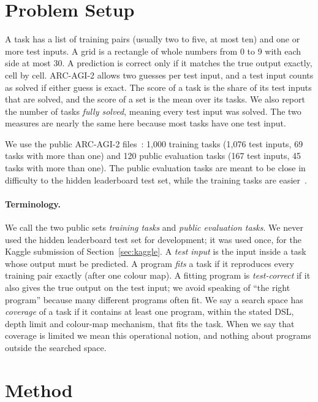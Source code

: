 \documentclass[sigconf,nonacm]{acmart}
\begin{document}
\section{Problem Setup}

A task has a list of training pairs (usually two to five, at most ten) and one or more test inputs. A grid is a rectangle of whole numbers from 0 to 9 with each side at most 30. A prediction is correct only if it matches the true output exactly, cell by cell. ARC-AGI-2 allows two guesses per test input, and a test input counts as solved if either guess is exact. The score of a task is the share of its test inputs that are solved, and the score of a set is the mean over its tasks. We also report the number of tasks \emph{fully solved}, meaning every test input was solved. The two measures are nearly the same here because most tasks have one test input.

We use the public ARC-AGI-2 files~\cite{arcprize2025data}: 1{,}000 training tasks (1{,}076 test inputs, 69 tasks with more than one) and 120 public evaluation tasks (167 test inputs, 45 tasks with more than one). The public evaluation tasks are meant to be close in difficulty to the hidden leaderboard test set, while the training tasks are easier~\cite{chollet2025arcagi2}.

\paragraph{Terminology.} We call the two public sets \emph{training tasks} and \emph{public evaluation tasks}. We never used the hidden leaderboard test set for development; it was used once, for the Kaggle submission of Section~\ref{sec:kaggle}. A \emph{test input} is the input inside a task whose output must be predicted. A program \emph{fits} a task if it reproduces every training pair exactly (after one colour map). A fitting program is \emph{test-correct} if it also gives the true output on the test input; we avoid speaking of ``the right program'' because many different programs often fit. We say a search space has \emph{coverage} of a task if it contains at least one program, within the stated DSL, depth limit and colour-map mechanism, that fits the task. When we say that coverage is limited we mean this operational notion, and nothing about programs outside the searched space.

\section{Method}
\end{document}
